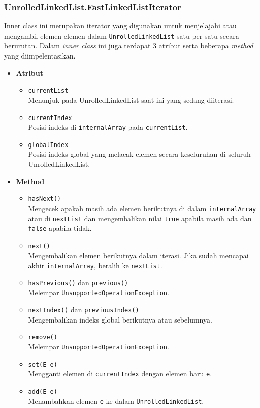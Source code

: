 
\subsubsection{UnrolledLinkedList.FastLinkedListIterator}
Inner class ini merupakan iterator yang digunakan untuk menjelajahi atau mengambil elemen-elemen dalam \texttt{UnrolledLinkedList} satu per satu secara berurutan. Dalam \textit{inner class} ini juga terdapat 3 atribut serta beberapa \textit{method} yang diimpelentasikan.
\begin{itemize}
    \item \textbf{Atribut}
    \begin{itemize}
        \item \texttt{currentList}
        \\ Menunjuk pada UnrolledLinkedList saat ini yang sedang diiterasi.
        \item \texttt{currentIndex}
        \\ Posisi indeks di \texttt{internalArray} pada \texttt{currentList}.
        \item \texttt{globalIndex}
        \\ Posisi indeks global yang melacak elemen secara keseluruhan di seluruh UnrolledLinkedList.
    \end{itemize}

    \item \textbf{Method}
    \begin{itemize}
        \item \texttt{hasNext()}
        \\ Mengecek apakah masih ada elemen berikutnya di dalam \texttt{internalArray} atau di \texttt{nextList} dan mengembalikan nilai \texttt{true} apabila masih ada dan \texttt{false} apabila tidak.
        \item \texttt{next()}
        \\Mengembalikan elemen berikutnya dalam iterasi. Jika sudah mencapai akhir \texttt{internalArray}, beralih ke \texttt{nextList}.
        \item \texttt{hasPrevious()} dan \texttt{previous()}
        \\Melempar \texttt{UnsupportedOperationException}.
        \item \texttt{nextIndex()} dan \texttt{previousIndex()}
        \\Mengembalikan indeks global berikutnya atau sebelumnya.
        \item \texttt{remove()}
        \\Melempar \texttt{UnsupportedOperationException}.
        \item \texttt{set(E e)}
        \\Mengganti elemen di \texttt{currentIndex} dengan elemen baru \texttt{e}.
        \item \texttt{add(E e)}
        \\Menambahkan elemen \texttt{e} ke dalam \texttt{UnrolledLinkedList}.
    \end{itemize}
\end{itemize}

